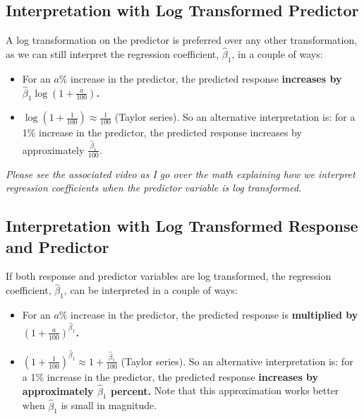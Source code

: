 \documentclass[
]{book}
\providecommand{\tightlist}{%
  \setlength{\itemsep}{0pt}\setlength{\parskip}{0pt}}
\begin{document}
\hypertarget{interpretation-with-log-transformed-predictor}{%
\subsection{Interpretation with Log Transformed Predictor}\label{interpretation-with-log-transformed-predictor}}

A log transformation on the predictor is preferred over any other transformation, as we can still interpret the regression coefficient, \(\hat{\beta}_1\), in a couple of ways:

\begin{itemize}
\tightlist
\item
  For an \(a\%\) increase in the predictor, the predicted response \textbf{increases by \(\hat{\beta}_1 \log(1+ \frac{a}{100})\).}
\item
  \(\log(1 + \frac{1}{100}) \approx \frac{1}{100}\) (Taylor series). So an alternative interpretation is: for a 1\% increase in the predictor, the predicted response increases by approximately \(\frac{\hat{\beta}_1}{100}\).
\end{itemize}

\emph{Please see the associated video as I go over the math explaining how we interpret regression coefficients when the predictor variable is log transformed.}

\hypertarget{interpretation-with-log-transformed-response-and-predictor}{%
\subsection{Interpretation with Log Transformed Response and Predictor}\label{interpretation-with-log-transformed-response-and-predictor}}

If both response and predictor variables are log transformed, the regression coefficient, \(\hat{\beta}_1\), can be interpreted in a couple of ways:

\begin{itemize}
\item
  For an \(a\%\) increase in the predictor, the predicted response is \textbf{multiplied by \((1 + \frac{a}{100})^{\hat{\beta}_1}\).}
\item
  \((1 + \frac{1}{100})^{\hat{\beta}_1} \approx 1 + \frac{\hat{\beta}_1}{100}\) (Taylor series). So an alternative interpretation is: for a 1\% increase in the predictor, the predicted response \textbf{increases by approximately \(\hat{\beta}_1\) percent.} Note that this approximation works better when \({\hat{\beta}_1}\) is small in magnitude.
\end{itemize}
\end{document}
